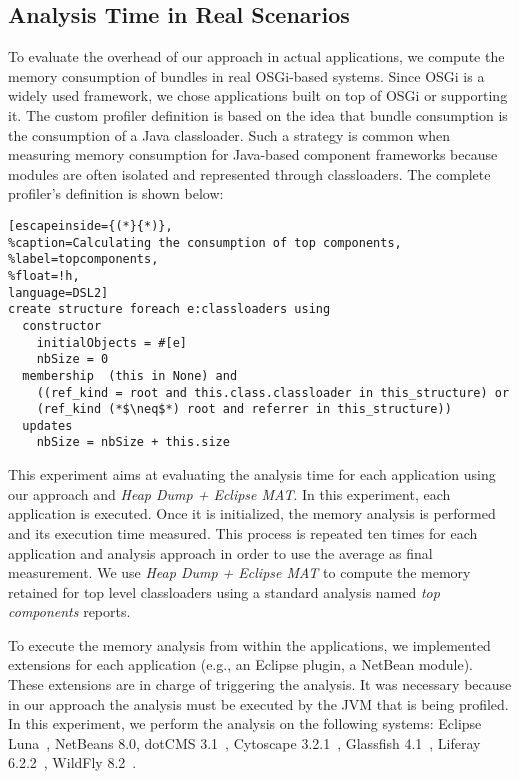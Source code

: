 \subsection{Analysis Time in Real Scenarios}
To evaluate the overhead of our approach in actual applications, 
we compute the memory consumption of bundles in real OSGi-based systems.
Since OSGi is a widely used framework, we chose applications built on top of OSGi or supporting it.
The custom profiler definition is based on the idea that bundle consumption is the consumption of a Java classloader.
Such a strategy is common when measuring memory consumption for Java-based component frameworks because modules are often isolated and represented through classloaders.
The complete profiler's definition is shown below:
\begin{lstlisting}[escapeinside={(*}{*)},
%caption=Calculating the consumption of top components,
%label=topcomponents,
%float=!h, 
language=DSL2]
create structure foreach e:classloaders using
  constructor
    initialObjects = #[e]
    nbSize = 0
  membership  (this in None) and 
    ((ref_kind = root and this.class.classloader in this_structure) or
	(ref_kind (*$\neq$*) root and referrer in this_structure))
  updates
    nbSize = nbSize + this.size
\end{lstlisting}

This experiment aims at evaluating the analysis time for each application using our approach and \textit{Heap Dump + Eclipse MAT}.
In this experiment, each application is executed. Once it is initialized, the memory analysis is performed and its execution time measured.
This process is repeated ten times for each application and analysis approach in order to use the average as final measurement.
We use \textit{Heap Dump + Eclipse MAT}  to compute the memory retained for top level classloaders using  a standard analysis named \textit{top components} reports. 

To execute the memory analysis from within the applications, we implemented extensions for each application (e.g., an Eclipse plugin, a NetBean module).
These extensions are in charge of triggering the analysis.
It was necessary because in our approach the analysis must be executed by the JVM that is being profiled.
In this experiment, we perform the analysis on the following systems: Eclipse Luna~\cite{luna}, NetBeans 8.0\cite{netbeans}, dotCMS 3.1~\cite{dotcms}, Cytoscape 3.2.1~\cite{cytoscape}, Glassfish 4.1~\cite{glassfish},  Liferay 6.2.2~\cite{liferay}, WildFly 8.2~\cite{wildfly}.

